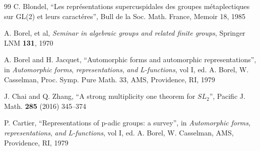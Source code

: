\documentclass[12pt,letterpaper,openany]{book}
\theoremstyle{plain}
\theoremstyle{definition}
\theoremstyle{remark}
\theoremstyle{remark}
\begin{document}
\begin{thebibliography}{99}
 C. Blondel, ``Les repr\'esentations supercuspidales
des groupes
m\'etaplectiques sur GL(2) et leurs caract\'eres'',
Bull de la Soc. Math. France, Memoir 18, 1985


 A. Borel, et al, \emph{Seminar in algebraic groups and
related finite groups}, Springer LNM \textbf{131}, 1970

 A. Borel and H. Jacquet, ``Automorphic forms and automorphic
representations'', in \emph{Automorphic} \emph{forms},
\emph{representations}, \emph{and} \emph{L-functions},
vol I, ed. A. Borel, W. Casselman, Proc. Symp. Pure Math. 33, AMS,
Providence, RI, 1979

 J. Chai and Q. Zhang, ``A strong multiplicity one theorem
for $SL_2$'', Pacific J. Math. \textbf{285} (2016) 345--374


 P. Cartier, ``Representations of p-adic groups: a survey'',
in \emph{Automorphic} \emph{forms},
\emph{representations}, \emph{and} \emph{L-functions},
vol I, ed. A. Borel, W. Casselman, AMS, Providence, RI, 1979








\end{thebibliography}
\end{document}
